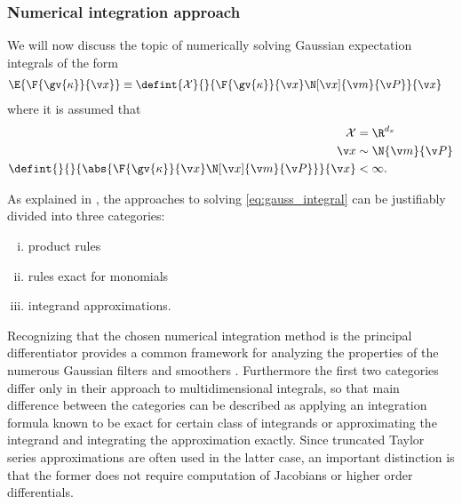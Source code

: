 \subsubsection{Numerical integration approach}
 We will now discuss the topic of numerically solving Gaussian 
 expectation integrals of the form
 \begin{align}
	\E{\F{\gv{\kappa}}{\x}}&\equiv \defint{\mathcal{X}}{}{\F{\gv{\kappa}}{\x}\N[\x]{\m}{\P}}{\x}
	\label{eq:gauss_integral}
\end{align}%
where it is assumed that 
\begin{align}
	\mathcal{X} &= \R^{d_x}\\
	\x &\sim \N{\m}{\P}\\
	\defint{}{}{\abs{\F{\gv{\kappa}}{\x}\N[\x]{\m}{\P}}}{\x} & < \infty. 
\end{align}

As explained in \textcite{Wu2006}, the approaches to solving \eqref{eq:gauss_integral}
can be justifiably divided into three categories: 
\begin{enumerate}[i)] \addtolength{\leftskip}{.5cm} \itemsep1pt \parskip0pt 
  \item product rules
  \item rules exact for monomials
  \item integrand approximations.
\end{enumerate}
Recognizing that the chosen numerical integration method is the principal differentiator provides a 
common framework for analyzing the properties of the numerous Gaussian filters and smoothers 
\parencite{Sarkka2010, Sarkka2008a,Ito2000,Wu2006,julier1997new,Arasaratnam2009,Arasaratnam2011}.
Furthermore the first two categories differ only in their approach to multidimensional integrals,
so that main difference between the categories can be described
as applying an integration formula known to be exact for certain class of integrands
or approximating the integrand and integrating the approximation exactly.
Since truncated Taylor series approximations are often used in the latter case, an important distinction
is that the former does not require computation of Jacobians or higher order differentials. 


